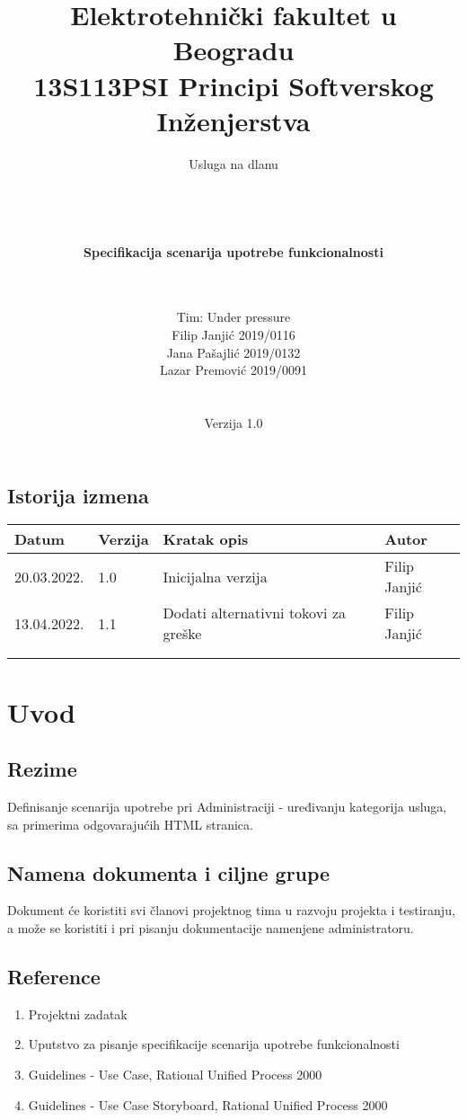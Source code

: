 \documentclass[a4paper,12pt]{report}
\title{\Large Elektrotehnički fakultet u Beogradu \\ 13S113PSI Principi Softverskog Inženjerstva}
\author{\Huge Usluga na dlanu\\ \ \\ \ \\ \ \\ \ \\
	\Large \textbf{Specifikacija scenarija upotrebe funkcionalnosti}\\\Large \textbf{\genitivfunkcionalnosti} \\ \ \\}
\date{\Large   Tim: Under pressure \\ Filip Janjić 2019/0116 \\ Jana Pašajlić 2019/0132 \\ Lazar Premović 2019/0091  \\ \  \\ \  \\
	\large Verzija 1.0}
\newcommand{\dativfunkcionalnosti }{Administraciji - uređivanju kategorija usluga}
\newcommand{\inicijalniautor}{Filip Janjić}
\newcommand{\inicijalnidatum}{20.03.2022.}
\begin{document}
	
	\maketitle
	
	\begin{center}
		\section*{Istorija izmena}
			\begin{tabular}{ |l|l|l|l| }
				\hline
				\textbf{Datum} & \textbf{Verzija} & \textbf{Kratak opis} & \textbf{Autor} \\ 
				\hline
				\inicijalnidatum & 1.0  & Inicijalna verzija & \inicijalniautor \\
				\hline
				13.04.2022. & 1.1  & Dodati alternativni tokovi za greške & \inicijalniautor \\
				\hline
				&  &  &  \\
				\hline
				&  &  &  \\
				\hline
			\end{tabular}
	\end{center}
	
	\newpage
	
	\tableofcontents
	
	\newpage
	
	\section{Uvod}
		\subsection{Rezime}
			Definisanje scenarija upotrebe pri \dativfunkcionalnosti, sa primerima odgovarajućih HTML stranica.
		\subsection{Namena dokumenta i ciljne grupe}
			Dokument će koristiti svi članovi projektnog tima u razvoju projekta i testiranju, a može se koristiti i pri pisanju dokumentacije namenjene administratoru.
		\subsection{Reference}
			\begin{enumerate}
				\item Projektni zadatak
				\item Uputstvo za pisanje specifikacije scenarija upotrebe funkcionalnosti
				\item Guidelines - Use Case, Rational Unified Process 2000
				\item Guidelines - Use Case Storyboard, Rational Unified Process 2000
			\end{enumerate}
\end{document}
